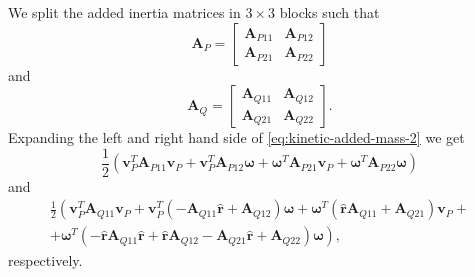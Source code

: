 \documentclass[onecolumn]{article}
\begin{document}
We split the added inertia matrices in $3 \times 3$ blocks such that
\begin{equation}
    \bm{A}_P =
    \left[
    \begin{array}{cc}
        \bm{A}_{P11} & \bm{A}_{P12} \\
        \bm{A}_{P21} & \bm{A}_{P22}
    \end{array}
    \right]
\end{equation}
and
\begin{equation}
    \bm{A}_Q =
    \left[
    \begin{array}{cc}
        \bm{A}_{Q11} & \bm{A}_{Q12} \\
        \bm{A}_{Q21} & \bm{A}_{Q22}
    \end{array}
    \right].
\end{equation}
Expanding the left and right hand side of \eqref{eq:kinetic-added-mass-2} we get
\begin{equation}
   \frac{1}{2} \left( \bm{v}_P^T \bm{A}_{P11} \bm{v}_P + \bm{v}_P^T \bm{A}_{P12} \bm{\omega} + \bm{\omega}^T \bm{A}_{P21} \bm{v}_P + \bm{\omega}^T \bm{A}_{P22} \bm{\omega} \right)
   \label{eq:left-side}
\end{equation}
and
\begin{multline}
    \frac{1}{2} \left( \bm{v}_P^T \bm{A}_{Q11} \bm{v}_P + \bm{v}_P^T \left( -\bm{A}_{Q11} \hat{\bm{r}} + \bm{A}_{Q12} \right) \bm{\omega} + \bm{\omega}^T \left( \hat{\bm{r}} \bm{A}_{Q11} + \bm{A}_{Q21} \right) \bm{v}_P + \right. \\
    \left. + \bm{\omega}^T \left( -\hat{\bm{r}} \bm{A}_{Q11} \hat{\bm{r}} + \hat{\bm{r}} \bm{A}_{Q12} - \bm{A}_{Q21} \hat{\bm{r}} + \bm{A}_{Q22} \right) \bm{\omega} \right),
   \label{eq:right-side}
\end{multline}
respectively.
\end{document}
